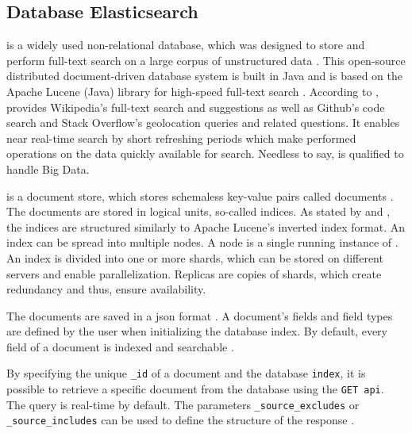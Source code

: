 
\subsection{Database Elasticsearch}\label{sec:db}

\databaseName{} is a widely used non-relational database, which was designed to store and perform full-text search on a large corpus of unstructured data \cite{Elasticsearch2017}.
This open-source distributed document-driven database system is built in Java and is based on the Apache Lucene (Java) library for high-speed full-text search \cite{Elasticsearch2017, Elasticsearch2019}.
According to \citeauthor{Elasticsearch2019}, \databaseName{} provides Wikipedia's full-text search 
and suggestions as well as Github's code search and Stack Overflow's geolocation queries and related questions.
It enables near real-time search by short refreshing periods which make performed operations on the data quickly available for search.
Needless to say, \databaseName{} is qualified to handle Big Data.

\databaseName{} is a document store, which stores schemaless key-value pairs called documents \cite{flask2018}.
The documents are stored in logical units, so-called indices.
As stated by \citeauthor{Elasticsearch2019} and \citeauthor{Elasticsearch2017}, the indices are structured similarly to Apache Lucene's inverted index format.
An index can be spread into multiple nodes.
A node is a single running instance of \databaseName{} \cite{Elasticsearch2019}.
An index is divided into one or more shards, which can be stored on different servers and enable parallelization.
Replicas are copies of shards, which create redundancy and thus, ensure availability. %

The documents are saved in a \ac{json} format \cite{Elasticsearch2017}.
A document's fields and field types are defined by the user when initializing the database index.
By default, every field of a document is indexed and searchable \cite{Elasticsearch2019}.

By specifying the unique \texttt{\_id} of a document and the database \texttt{index}, it is possible to retrieve a specific document from the database using the \texttt{GET \ac{api}}.
The query is real-time by default.
The parameters \texttt{\_source\_excludes} or \texttt{\_source\_includes} can be used to define the structure of the response \cite{Elasticsearch-get}.


